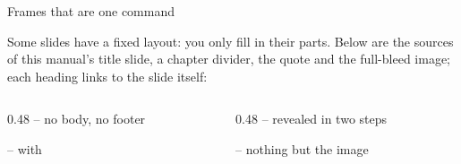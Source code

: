 
\begin{standardframe}{Frames that are one command}
	{\small Some slides have a fixed layout: you only fill in their parts. Below
	are the sources of this manual's title slide, a chapter divider, the quote and
	the full-bleed image; each heading links to the slide itself:\par}
	\medskip
	\begin{columns}[t,onlytextwidth]
		\begin{column}{0.48\linewidth}
			 -- no body, no footer\par\smallskip
			\par\bigskip
			 -- with \par\smallskip
		\end{column}
		\begin{column}{0.48\linewidth}
			 -- revealed in two steps\par\smallskip
			\par\bigskip
			 -- nothing but the image\par\smallskip
		\end{column}
	\end{columns}
\end{standardframe}
